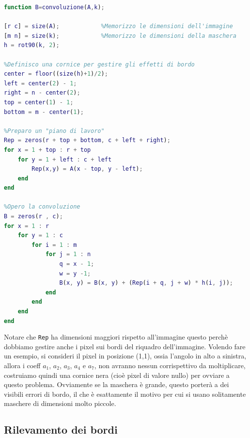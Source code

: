 \begin{lstlisting}[language=MATLAB]
function B=convoluzione(A,k);

[r c] = size(A);            %Memorizzo le dimensioni dell'immagine
[m n] = size(k);            %Memorizzo le dimensioni della maschera
h = rot90(k, 2);

%Definisco una cornice per gestire gli effetti di bordo
center = floor((size(h)+1)/2);                  
left = center(2) - 1;
right = n - center(2);
top = center(1) - 1;
bottom = m - center(1);

%Preparo un "piano di lavoro"
Rep = zeros(r + top + bottom, c + left + right);
for x = 1 + top : r + top
    for y = 1 + left : c + left
        Rep(x,y) = A(x - top, y - left);
    end
end

%Opero la convoluzione
B = zeros(r , c);
for x = 1 : r
    for y = 1 : c
        for i = 1 : m
            for j = 1 : n
                q = x - 1;
                w = y -1;
                B(x, y) = B(x, y) + (Rep(i + q, j + w) * h(i, j));
            end
        end
    end
end

\end{lstlisting}
Notare che \texttt{Rep} ha dimensioni maggiori rispetto all'immagine questo perchè dobbiamo gestire anche i pixel sui bordi del riquadro dell'immagine. Volendo fare un esempio, si consideri il pixel in posizione (1,1), ossia l'angolo in alto a sinistra, allora i coeff $a_1$, $a_2$, $a_3$, $a_4$ e $a_7$, non avranno nessun corrispettivo da moltiplicare, costruiamo quindi una cornice nera (cioè pixel di valore nullo) per ovviare a questo problema. Ovviamente se la maschera è grande, questo porterà a dei visibili errori di bordo, il che è esattamente il motivo per cui si usano solitamente maschere di dimensioni molto piccole.





\subsection{Rilevamento dei bordi}

